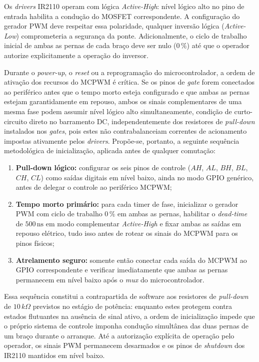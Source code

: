 Os \textit{drivers} IR2110 operam com lógica \textit{Active-High}: nível lógico alto no pino de entrada habilita a condução do MOSFET correspondente. A configuração do gerador PWM deve respeitar essa polaridade, qualquer inversão lógica (\textit{Active-Low}) comprometeria a segurança da ponte. Adicionalmente, o ciclo de trabalho inicial de ambas as pernas de cada braço deve ser nulo ($0\,\%$) até que o operador autorize explicitamente a operação do inversor.

Durante o \textit{power-up}, o \textit{reset} ou a reprogramação do microcontrolador, a ordem de ativação dos recursos do MCPWM é crítica. Se os pinos de \textit{gate} forem conectados ao periférico antes que o tempo morto esteja configurado e que ambas as pernas estejam garantidamente em repouso, ambos os sinais complementares de uma mesma fase podem assumir nível lógico alto simultaneamente, condição de curto-circuito direto no barramento DC, independentemente dos resistores de \textit{pull-down} instalados nos \textit{gates}, pois estes não contrabalanceiam correntes de acionamento impostas ativamente pelos \textit{drivers}. Propõe-se, portanto, a seguinte sequência metodológica de inicialização, aplicada antes de qualquer comutação:

\begin{enumerate}
    \item \textbf{Pull-down lógico:} configurar os seis pinos de controle ($AH$, $AL$, $BH$, $BL$, $CH$, $CL$) como saídas digitais em nível baixo, ainda no modo GPIO genérico, antes de delegar o controle ao periférico MCPWM;
    \item \textbf{Tempo morto primário:} para cada timer de fase, inicializar o gerador PWM com ciclo de trabalho $0\,\%$ em ambas as pernas, habilitar o \textit{dead-time} de $500\,\text{ns}$ em modo complementar \textit{Active-High} e fixar ambas as saídas em repouso elétrico, tudo isso antes de rotear os sinais do MCPWM para os pinos físicos;
    \item \textbf{Atrelamento seguro:} somente então conectar cada saída do MCPWM ao GPIO correspondente e verificar imediatamente que ambas as pernas permanecem em nível baixo após o \textit{mux} do microcontrolador.
\end{enumerate}

Essa sequência constitui a contrapartida de software aos resistores de \textit{pull-down} de $10\,k\Omega$ previstos no estágio de potência: enquanto estes protegem contra estados flutuantes na ausência de sinal ativo, a ordem de inicialização impede que o próprio sistema de controle imponha condução simultânea das duas pernas de um braço durante o arranque. Até a autorização explícita de operação pelo operador, os sinais PWM permanecem desarmados e os pinos de \textit{shutdown} dos IR2110 mantidos em nível baixo.

